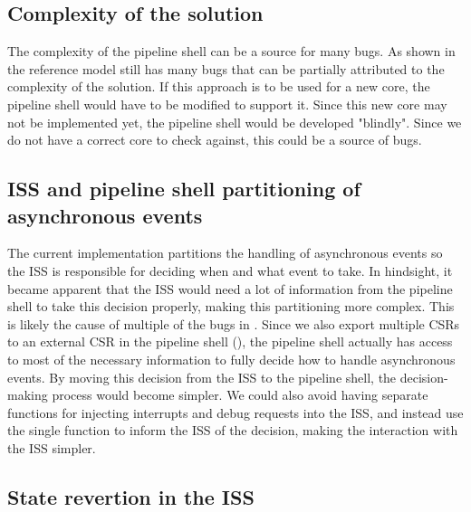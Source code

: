 \subsection{Complexity of the solution}


The complexity of the pipeline shell can be a source for many bugs. As shown in  the reference model still has many bugs that can be partially attributed to the complexity of the solution. If this approach is to be used for a new core, the pipeline shell would have to be modified to support it. Since this new core may not be implemented yet, the pipeline shell would be developed "blindly". Since we do not have a correct core to check against, this could be a source of bugs.

\subsection{ISS and pipeline shell partitioning of asynchronous events}

The current implementation partitions the handling of asynchronous events so the ISS is responsible for deciding when and what event to take. In hindsight, it became apparent that the ISS would need a lot of information from the pipeline shell to take this decision properly, making this partitioning more complex. This is likely the cause of multiple of the bugs in . Since we also export multiple CSRs to an external CSR in the pipeline shell (), the pipeline shell actually has access to most of the necessary information to fully decide how to handle asynchronous events. By moving this decision from the ISS to the pipeline shell, the decision-making process would become simpler. We could also avoid having separate functions for injecting interrupts and debug requests into the ISS, and instead use the single  function to inform the ISS of the decision, making the interaction with the ISS simpler.

\subsection{State revertion in the ISS}

